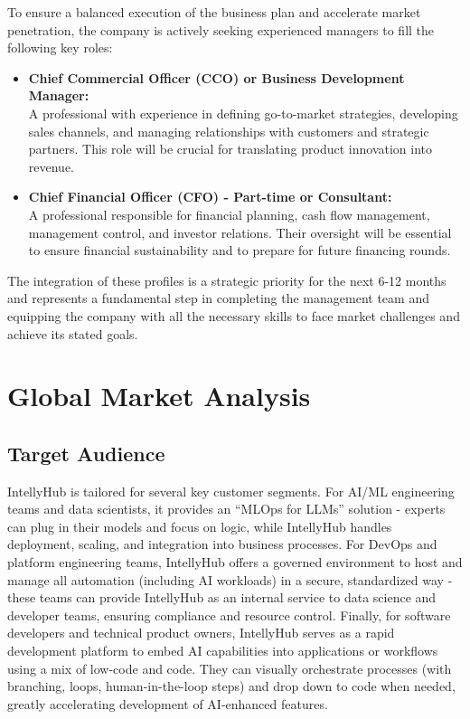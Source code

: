 \documentclass[11pt, a4paper, oneside]{article}
\begin{document}
To ensure a balanced execution of the business plan and accelerate market penetration, the company is actively seeking experienced managers to fill the following key roles:

\begin{itemize}
    \item \textbf{Chief Commercial Officer (CCO) or Business Development Manager:} \\
    A professional with experience in defining go-to-market strategies, developing sales channels, and managing relationships with customers and strategic partners. This role will be crucial for translating product innovation into revenue.

    \item \textbf{Chief Financial Officer (CFO) - Part-time or Consultant:} \\
    A professional responsible for financial planning, cash flow management, management control, and investor relations. Their oversight will be essential to ensure financial sustainability and to prepare for future financing rounds.
\end{itemize}

The integration of these profiles is a strategic priority for the next 6-12 months and represents a fundamental step in completing the management team and equipping the company with all the necessary skills to face market challenges and achieve its stated goals.


\section{Global Market Analysis}
\subsection{Target Audience}
IntellyHub is tailored for several key customer segments. For AI/ML engineering teams and data scientists, it provides an “MLOps for LLMs” solution - experts can plug in their models and focus on logic, while IntellyHub handles deployment, scaling, and integration into business processes. For DevOps and platform engineering teams, IntellyHub offers a governed environment to host and manage all automation (including AI workloads) in a secure, standardized way - these teams can provide IntellyHub as an internal service to data science and developer teams, ensuring compliance and resource control. Finally, for software developers and technical product owners, IntellyHub serves as a rapid development platform to embed AI capabilities into applications or workflows using a mix of low-code and code. They can visually orchestrate processes (with branching, loops, human-in-the-loop steps) and drop down to code when needed, greatly accelerating development of AI-enhanced features.
\end{document}
